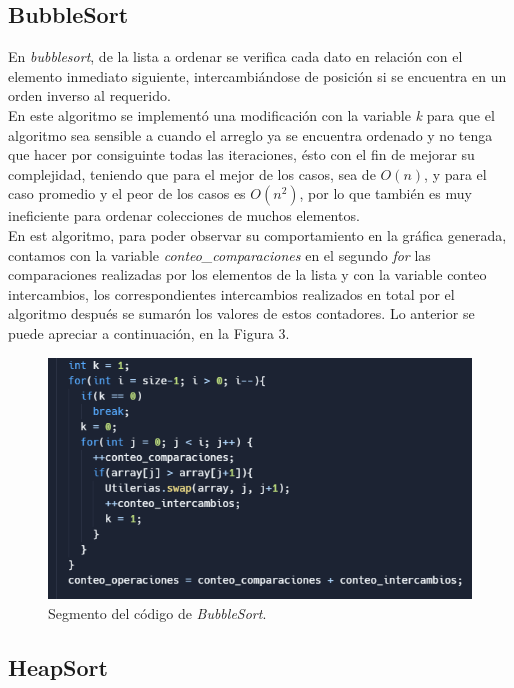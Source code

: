 \documentclass[a4paper,12pt]{article}
\begin{document}
\subsection{BubbleSort}

En \textit{bubblesort}, de la lista a ordenar se verifica cada dato en relación con el elemento inmediato siguiente, intercambiándose de posición si se encuentra en un orden inverso al requerido.\\

En este algoritmo se implementó una modificación con la variable \textit{k} para que el algoritmo sea sensible a cuando el arreglo ya se encuentra ordenado y no tenga que hacer por consiguinte todas las iteraciones, ésto con el fin de mejorar su complejidad, teniendo que para el mejor de los casos, sea de $O(n)$, y para el caso promedio y el peor de los casos es $O(n^2)$, por lo que también es muy ineficiente para ordenar colecciones de muchos elementos.\\

En est algoritmo, para poder observar su comportamiento en la gráfica generada, contamos con la variable \textit{conteo\_comparaciones} en el segundo \textit{for} las comparaciones realizadas por los elementos de la lista y con la variable conteo intercambios, los correspondientes intercambios realizados en total por el algoritmo después se sumarón los valores de estos contadores. Lo anterior se puede apreciar a continuación, en la Figura 3.

\begin{figure}[h]
    \centering
    \includegraphics[width=0.8\linewidth]{media/bubble.png}
    \caption{Segmento del código de \textit{BubbleSort}.}
    \label{fig:enter-label}
\end{figure}

\subsection{HeapSort}
\end{document}
